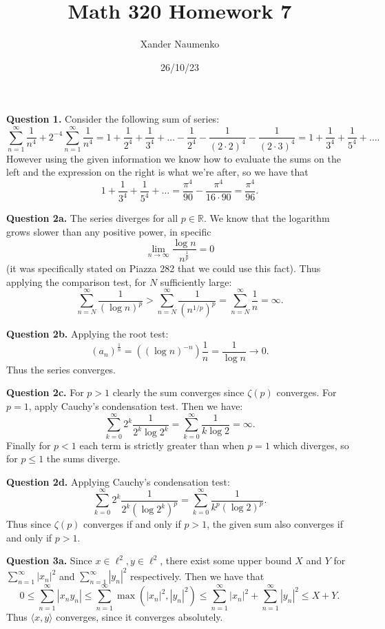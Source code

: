 \documentclass[letterpaper, reqno,11pt]{article}
\begin{document}
\title{Math 320 Homework 7}
\date{26/10/23}
\author{Xander Naumenko}
\maketitle

{\medskip\noindent\bf Question 1.} Consider the following sum of series:
\[
\sum_{n=1}^{\infty}\frac{1}{n^{4}}+2^{-4}\sum_{n=1}^{\infty}\frac{1}{n^{4}}=1+\frac{1}{2^{4}}+\frac{1}{3^{4}}+\ldots-\frac{1}{2^{4}}-\frac{1}{(2\cdot 2)^{4}}-\frac{1}{(2\cdot 3)^{4}}=1+\frac{1}{3^{4}}+\frac{1}{5^{4}}+\ldots
.\]
However using the given information we know how to evaluate the sums on the left and the expression on the right is what we're after, so we have that
\[
1+\frac{1}{3^{4}}+\frac{1}{5^{4}}+\ldots = \frac{\pi^{4}}{90}-\frac{\pi^{4}}{16\cdot 90}=\frac{\pi^{4}}{96}
.\]

\newpage\phantom{blabla}
\newpage

{\medskip\noindent\bf Question 2a.} The series diverges for all $p\in \mathbb{R}$. We know that the logarithm grows slower than any positive power, in specific
\[
\lim_{n\to\infty}\frac{\log n}{n^{\frac{1}{p}}}=0
\]
(it was specifically stated on Piazza 282 that we could use this fact). Thus applying the comparison test, for $N$ sufficiently large:
\[
\sum_{n=N}^{\infty}\frac{1}{(\log n)^{p}}>\sum_{n=N}^{\infty}\frac{1}{(n^{1 /p})^{p}}=\sum_{n=N}^{\infty}\frac{1}{n}=\infty
.\]

{\medskip\noindent\bf Question 2b.} Applying the root test:
\[
    (a_n)^{\frac{1}{n}}=\left( (\log n)^{-n} \right) \frac{1}{n}=\frac{1}{\log n}\to 0
.\]
Thus the series converges.

{\medskip\noindent\bf Question 2c.} For $p>1$ clearly the sum converges since $\zeta(p)$ converges. For $p=1$, apply Cauchy's condensation test. Then we have:
\[
\sum_{k=0}^{\infty}2^{k} \frac{1}{2^{k}\log 2^{k}}=\sum_{k=0}^{\infty} \frac{1}{k\log 2}=\infty
.\]
Finally for $p<1$ each term is strictly greater than when $p=1$ which diverges, so for $p\leq 1$ the sums diverge.

{\medskip\noindent\bf Question 2d.} Applying Cauchy's condensation test:
\[
\sum_{k=0}^{\infty}2^{k} \frac{1}{2^{k}(\log 2^{k})^{p}}=\sum_{k=0}^{\infty} \frac{1}{k^{p}(\log 2)^{p}}
.\]
Thus since $\zeta(p)$ converges if and only if $p>1$, the given sum also converges if and only if $p>1$.

\newpage\phantom{blabla}
\newpage

{\medskip\noindent\bf Question 3a.} Since $x\in \ell^2,y\in \ell^2$, there exist some upper bound $X$ and $Y$ for $\sum_{n=1}^{\infty}|x_n|^2$ and $\sum_{n=1}^{\infty}|y_n|^2$ respectively. Then we have that
\[
0\leq \sum_{n=1}^{\infty}|x_ny_n|\leq \sum_{n=1}^{\infty}\max(|x_n|^2,|y_n|^2)\leq \sum_{n=1}^{\infty}|x_n|^2+\sum_{n=1}^{\infty}|y_n|^2\leq X+Y
.\]
Thus $\langle x,y\rangle$ converges, since it converges absolutely.
\end{document}
